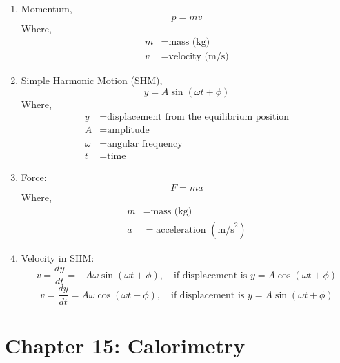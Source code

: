 \documentclass[12pt]{article}
\begin{document}
\begin{enumerate}[label=\roman*.]
	\item Momentum,
		\[
			p = mv
		\]
		Where,
		\begin{align*}
			m &= \text{mass (kg)} \\
			v &= \text{velocity (m/s)}
		\end{align*}

	\item Simple Harmonic Motion (SHM),
		\[
			y = A \sin (\omega t + \phi)
		\]
		Where,
		\begin{align*}
			y &= \text{displacement from the equilibrium position} \\
			A &= \text{amplitude} \\
			\omega &= \text{angular frequency} \\
			t &= \text{time}
		\end{align*}

	\item Force:
		\[
			F = ma
		\]
		Where,
		\begin{align*}
			m &= \text{mass (kg)} \\
			a &= \text{acceleration } (\text{m/s}^2)
		\end{align*}

	\item Velocity in SHM:
		\[
			v = \frac{dy}{dt} = - A \omega \sin(\omega t + \phi), \quad \text{if displacement is } y = A \cos(\omega t + \phi)
		\]
		\[
			v = \frac{dy}{dt} = A \omega \cos(\omega t + \phi), \quad \text{if displacement is } y = A \sin(\omega t + \phi)
		\]

\end{enumerate}

\section{Chapter 15: Calorimetry}
\end{document}
